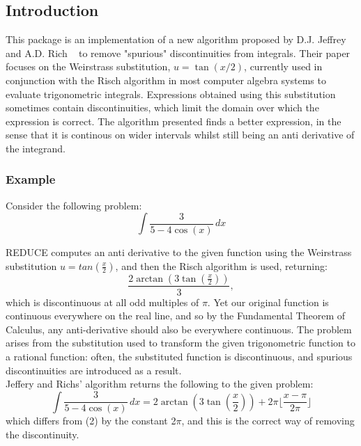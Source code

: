 
\subsection{Introduction}
This package is an implementation of a new algorithm proposed by D.J. Jeffrey and A.D. Rich ~\cite{Jeff} to remove "spurious" discontinuities from integrals. Their paper focuses on the Weirstrass substitution, $u=\tan(x/2)$, currently used in conjunction with the Risch algorithm in most computer algebra systems to evaluate trigonometric integrals. Expressions obtained using this substitution sometimes contain discontinuities, which limit the domain over which the expression is correct. The algorithm presented finds a better expression, in the sense that it is continous on wider intervals whilst still being an anti derivative of the integrand.

\subsubsection{Example}
 Consider the following problem:
     \begin{displaymath} \int \frac{3}{5-4\cos(x)}\,dx  \end{displaymath} 

\small{REDUCE} \normalsize computes an anti derivative to the given function using the Weirstrass substitution $u=tan(\frac{x}{2})$, and then the Risch algorithm is used, returning: 
    \begin{displaymath} \frac{2\arctan(3\tan(\frac{x}{2}))}{3}, \end{displaymath}
which is discontinuous at all odd multiples of $\pi$. Yet our original function is continuous everywhere on the real line, and so by the Fundamental Theorem of Calculus, any anti-derivative should also be everywhere continuous. The problem arises from the substitution used to transform the given trigonometric function to a rational function: often, the substituted function is discontinuous, and spurious discontinuities are introduced as a result. \\
Jeffery and Richs' algorithm returns the following to the given problem:
\[ \int \frac{3}{5-4\cos(x)}\,dx = 2\arctan(3\tan(\frac{x}{2}))+2\pi\lfloor \frac{x-\pi}{2\pi} \rfloor \]
which differs from (2) by the constant 2$\pi$, and this is the correct way of removing the discontinuity.

